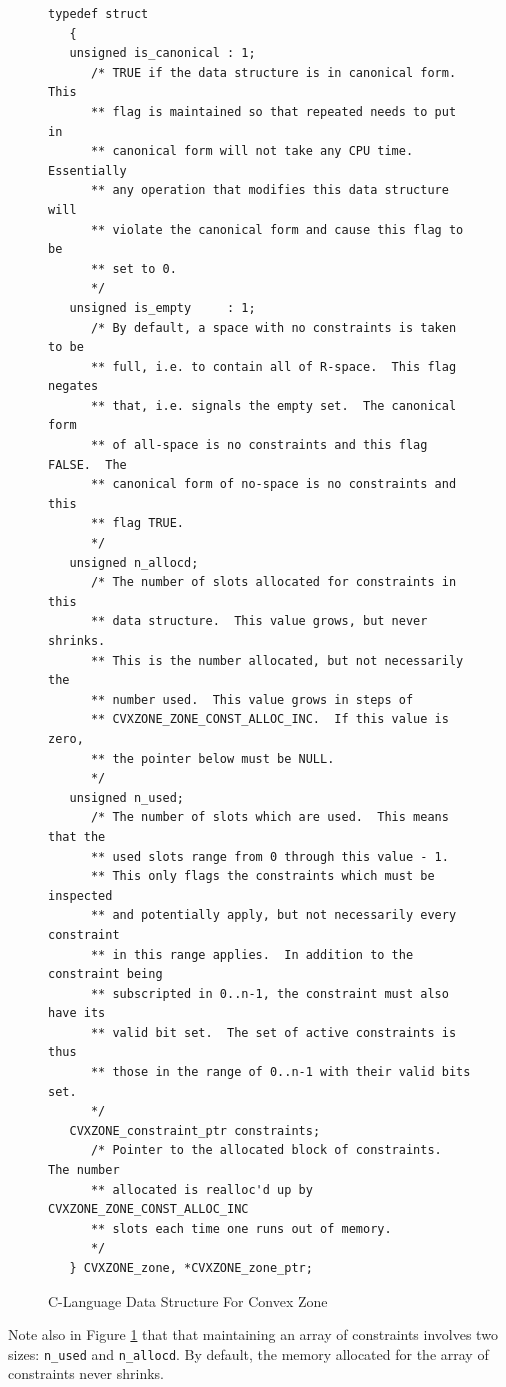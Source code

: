 \begin{figure}
\begin{small}
\begin{verbatim}
typedef struct
   {
   unsigned is_canonical : 1;
      /* TRUE if the data structure is in canonical form.  This
      ** flag is maintained so that repeated needs to put in
      ** canonical form will not take any CPU time.  Essentially
      ** any operation that modifies this data structure will
      ** violate the canonical form and cause this flag to be
      ** set to 0.
      */
   unsigned is_empty     : 1;
      /* By default, a space with no constraints is taken to be
      ** full, i.e. to contain all of R-space.  This flag negates
      ** that, i.e. signals the empty set.  The canonical form
      ** of all-space is no constraints and this flag FALSE.  The
      ** canonical form of no-space is no constraints and this
      ** flag TRUE.
      */
   unsigned n_allocd;
      /* The number of slots allocated for constraints in this
      ** data structure.  This value grows, but never shrinks.
      ** This is the number allocated, but not necessarily the
      ** number used.  This value grows in steps of 
      ** CVXZONE_ZONE_CONST_ALLOC_INC.  If this value is zero,
      ** the pointer below must be NULL.
      */
   unsigned n_used;
      /* The number of slots which are used.  This means that the
      ** used slots range from 0 through this value - 1.
      ** This only flags the constraints which must be inspected
      ** and potentially apply, but not necessarily every constraint
      ** in this range applies.  In addition to the constraint being
      ** subscripted in 0..n-1, the constraint must also have its
      ** valid bit set.  The set of active constraints is thus
      ** those in the range of 0..n-1 with their valid bits set.
      */
   CVXZONE_constraint_ptr constraints;
      /* Pointer to the allocated block of constraints.  The number
      ** allocated is realloc'd up by CVXZONE_ZONE_CONST_ALLOC_INC
      ** slots each time one runs out of memory.
      */
   } CVXZONE_zone, *CVXZONE_zone_ptr;
\end{verbatim}
\end{small}
\caption{C-Language Data Structure For Convex Zone}
\label{fig:siop0:sirn0:02}
\end{figure}

Note also in Figure \ref{fig:siop0:sirn0:02}
that that maintaining an array of constraints involves two sizes:
\texttt{n\_used} and \texttt{n\_allocd}.  By default,
the memory allocated for the array of constraints never shrinks.


